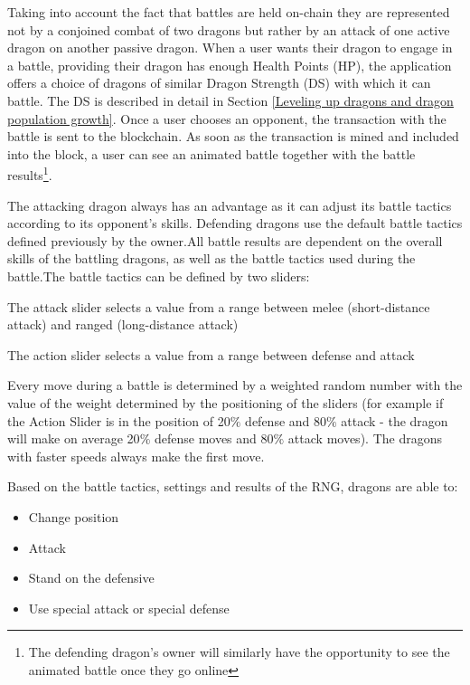 \documentclass[12pt]{article}
\begin{document}
Taking into account the fact that battles are held on-chain they are represented not by a conjoined combat of two dragons but rather by an attack of one active dragon on another passive dragon. When a user wants their dragon to engage in a battle, providing their dragon has enough Health Points (HP), the application offers a choice of dragons of similar Dragon Strength (DS) with which it can battle. The DS is described in detail in Section \ref{Leveling up dragons and dragon population growth}. Once a user chooses an opponent, the transaction with the battle is sent to the blockchain. As soon as the transaction is mined and included into the block, a user can see an animated battle together with the battle results\footnote{The defending dragon’s owner will similarly have the opportunity to see the animated battle once they go online}.\par

The attacking dragon always has an advantage as it can adjust its battle tactics according to its opponent’s skills. Defending dragons use the default battle tactics defined previously by the owner.All battle results are dependent on the overall skills of the battling dragons, as well as the battle tactics used during the battle.The battle tactics can be defined by two sliders:


\begin{itemize}
  \begin{samepage}
    \item The attack slider selects a value from a range between melee (short-distance attack) and ranged (long-distance attack)
    \item The action slider selects a value from a range between defense and attack
   \end{samepage}
\end{itemize}

Every move during a battle is determined by a weighted random number with the value of the weight determined by the positioning of the sliders (for example if the Action Slider is in the position of 20$\%$  defense and 80$\%$  attack - the dragon will make on average 20$\%$  defense moves and 80$\%$  attack moves). The dragons with faster speeds always make the first move.\par

\begin{samepage}
 Based on the battle tactics, settings and results of the RNG, dragons are able to:\par
 \begin{itemize}
    \item Change position
          \item Attack
          \item Stand on the defensive
          \item Use special attack or special defense
  \end{itemize}
\end{samepage}
\end{document}
